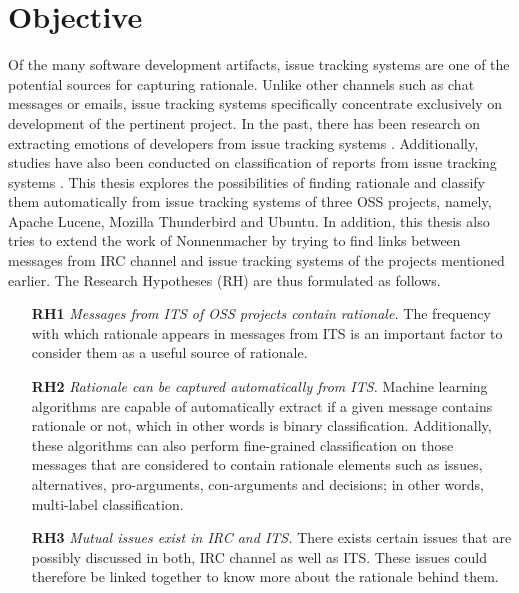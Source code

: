 \documentclass[a4paper,12pt,twoside]{report}
\begin{document}
\section{Objective}
Of the many software development artifacts, issue tracking systems are one of the potential sources for capturing rationale. Unlike other channels such as chat messages or emails, issue tracking systems specifically concentrate exclusively on development of the pertinent project. In the past, there has been research on extracting emotions of developers from issue tracking systems \cite{Marshall2016} \cite{Robillard2017}. Additionally, studies have also been conducted on classification of reports from issue tracking systems \cite{Fan2017}. This thesis explores the possibilities of finding rationale and classify them automatically from issue tracking systems of three OSS projects, namely, Apache Lucene, Mozilla Thunderbird and Ubuntu. In addition, this thesis also tries to extend the work of Nonnenmacher \cite{Nonnenmacher2017} by trying to find links between messages from IRC channel and issue tracking systems of the projects mentioned earlier. The Research Hypotheses (RH) are thus formulated as follows.

\begin{itemize}
\item[\textbf{RH1}] \textit{Messages from ITS of OSS projects contain rationale.} The frequency with which rationale appears in messages from ITS is an important factor to consider them as a useful source of rationale.   
\item[\textbf{RH2}] \textit{Rationale can be captured automatically from ITS.} Machine learning algorithms are capable of automatically extract if a given message contains rationale or not, which in other words is binary classification. Additionally, these algorithms can also perform fine-grained classification on those messages that are considered to contain rationale elements such as issues, alternatives, pro-arguments, con-arguments and decisions; in other words, multi-label classification. 
\item[\textbf{RH3}] \textit{Mutual issues exist in IRC and ITS.} There exists certain issues that are possibly discussed in both, IRC channel as well as ITS. These issues could therefore be linked together to know more about the rationale behind them.    
\end{itemize}
\end{document}
